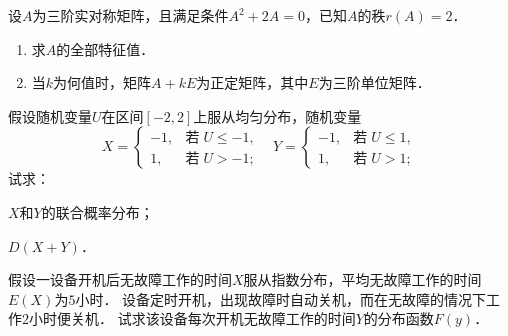 \documentclass[plain,noanswer,medmath]{../../template/jnuexam}
\begin{document}

\begin{problem}
设$A$为三阶实对称矩阵，且满足条件$A^2 + 2A = 0$，已知$A$的秩$r(A) = 2$．
\begin{enumerate}
\item 求$A$的全部特征值．
\item 当$k$为何值时，矩阵$A + kE$为正定矩阵，其中$E$为三阶单位矩阵．
\end{enumerate}
\end{problem}



\begin{problem}
假设随机变量$U$在区间$[-2,2]$上服从均匀分布，随机变量
$$X = \begin{cases}
  -1, & \text{若}\;U \le - 1, \\
   1, & \text{若}\;U > - 1;
\end{cases}\;\;\;Y = \begin{cases}
  -1, & \text{若}\;U \le 1, \\
   1, & \text{若}\;U > 1;
\end{cases}$$
试求：
\begin{enumerate*}
\item $X$和$Y$的联合概率分布；
\item $D(X + Y)$．
\end{enumerate*}
\end{problem}



\begin{problem}
假设一设备开机后无故障工作的时间$X$服从指数分布，平均无故障工作的时间$E(X)$为$5$小时．
设备定时开机，出现故障时自动关机，而在无故障的情况下工作$2$小时便关机．
试求该设备每次开机无故障工作的时间$Y$的分布函数$F(y)$．
\end{problem}
\end{document}

